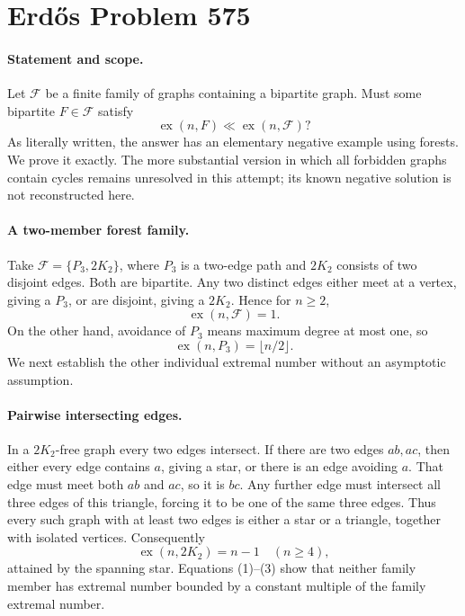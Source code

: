 \section*{Erd\H{o}s Problem 575}

\paragraph{Statement and scope.}
Let \(\mathcal F\) be a finite family of graphs containing a bipartite graph. Must some bipartite \(F\in\mathcal F\) satisfy
\[
 \operatorname{ex}(n,F)\ll\operatorname{ex}(n,\mathcal F)?
\]
As literally written, the answer has an elementary negative example using forests. We prove it exactly. The more substantial version in which all forbidden graphs contain cycles remains unresolved in this attempt; its known negative solution is not reconstructed here.

\paragraph{A two-member forest family.}
Take \(\mathcal F=\{P_3,2K_2\}\), where \(P_3\) is a two-edge path and \(2K_2\) consists of two disjoint edges. Both are bipartite. Any two distinct edges either meet at a vertex, giving a \(P_3\), or are disjoint, giving a \(2K_2\). Hence for \(n\geq2\),
\[
 \operatorname{ex}(n,\mathcal F)=1. \tag{1}
\]
On the other hand, avoidance of \(P_3\) means maximum degree at most one, so
\[
 \operatorname{ex}(n,P_3)=\lfloor n/2\rfloor. \tag{2}
\]
We next establish the other individual extremal number without an asymptotic assumption.

\paragraph{Pairwise intersecting edges.}
In a \(2K_2\)-free graph every two edges intersect. If there are two edges \(ab,ac\), then either every edge contains \(a\), giving a star, or there is an edge avoiding \(a\). That edge must meet both \(ab\) and \(ac\), so it is \(bc\). Any further edge must intersect all three edges of this triangle, forcing it to be one of the same three edges. Thus every such graph with at least two edges is either a star or a triangle, together with isolated vertices. Consequently
\[
 \operatorname{ex}(n,2K_2)=n-1\quad(n\geq4), \tag{3}
\]
attained by the spanning star. Equations (1)--(3) show that neither family member has extremal number bounded by a constant multiple of the family extremal number.


